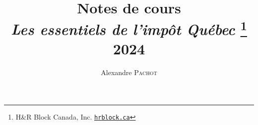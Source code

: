 \title{Notes de cours\\
	\textit{Les essentiels de l’impôt Québec}
	\thanks{H\&R Block Canada, Inc.
		\href{https://www.hrblock.ca/fr/notre-compagnie/ecole-de-formation-fiscale}
		{\texttt{hrblock.ca}}
	}\\
	2024
}
\author{Alexandre \textsc{Pachot}}
\predate{\begin{center}}
